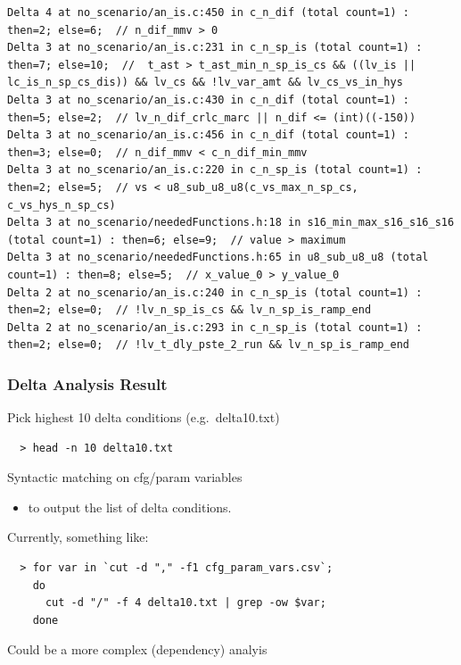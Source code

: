 \documentclass{beamer}
\begin{document}
\begin{frame}[fragile]
{\begin{verbatim}
Delta 4 at no_scenario/an_is.c:450 in c_n_dif (total count=1) : then=2; else=6;  // n_dif_mmv > 0
Delta 3 at no_scenario/an_is.c:231 in c_n_sp_is (total count=1) : then=7; else=10;  // 	t_ast > t_ast_min_n_sp_is_cs && ((lv_is || lc_is_n_sp_cs_dis)) && lv_cs && !lv_var_amt && lv_cs_vs_in_hys
Delta 3 at no_scenario/an_is.c:430 in c_n_dif (total count=1) : then=5; else=2;  // lv_n_dif_crlc_marc || n_dif <= (int)((-150))
Delta 3 at no_scenario/an_is.c:456 in c_n_dif (total count=1) : then=3; else=0;  // n_dif_mmv < c_n_dif_min_mmv
Delta 3 at no_scenario/an_is.c:220 in c_n_sp_is (total count=1) : then=2; else=5;  // vs < u8_sub_u8_u8(c_vs_max_n_sp_cs, c_vs_hys_n_sp_cs)
Delta 3 at no_scenario/neededFunctions.h:18 in s16_min_max_s16_s16_s16 (total count=1) : then=6; else=9;  // value > maximum
Delta 3 at no_scenario/neededFunctions.h:65 in u8_sub_u8_u8 (total count=1) : then=8; else=5;  // x_value_0 > y_value_0
Delta 2 at no_scenario/an_is.c:240 in c_n_sp_is (total count=1) : then=2; else=0;  // !lv_n_sp_is_cs && lv_n_sp_is_ramp_end
Delta 2 at no_scenario/an_is.c:293 in c_n_sp_is (total count=1) : then=2; else=0;  // !lv_t_dly_pste_2_run && lv_n_sp_is_ramp_end
  \end{verbatim}
  }
\end{frame} 



\begin{frame}[fragile]
  \frametitle{Delta Analysis Result}

  \bigskip
  Pick highest 10 delta conditions (e.g.~delta10.txt) 
  {\small
  \begin{verbatim}
  > head -n 10 delta10.txt
  \end{verbatim}
  }

  \bigskip
  Syntactic matching on cfg/param variables \\
  \begin{itemize}
    \item to output the list of delta conditions.
  \end{itemize}

  \bigskip
  Currently, something like:
  {\small
  \begin{verbatim}
  > for var in `cut -d "," -f1 cfg_param_vars.csv`; 
    do 
      cut -d "/" -f 4 delta10.txt | grep -ow $var;
    done
  \end{verbatim}
  }

  \bigskip
  Could be a more complex (dependency) analyis 
\end{frame} 
\end{document}
